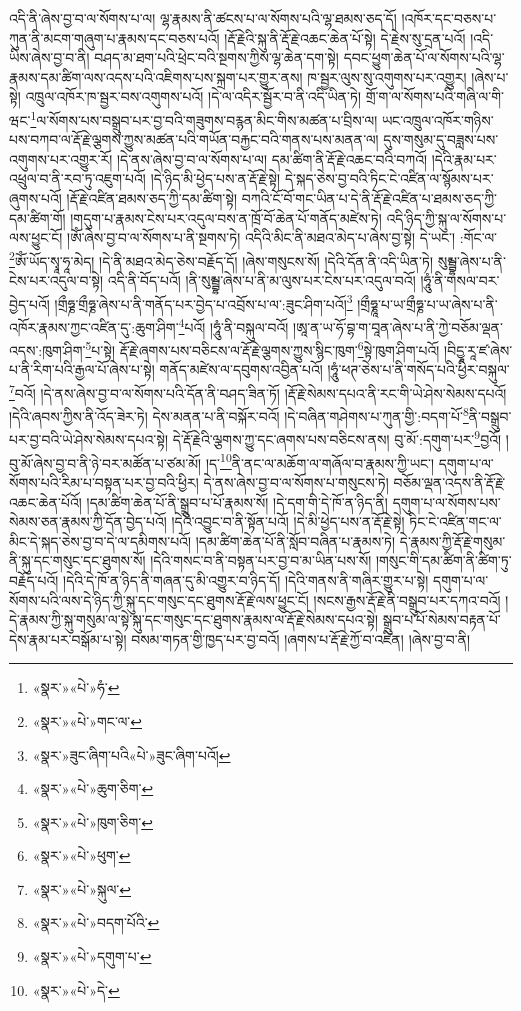 འདི་ནི་ཞེས་བྱ་བ་ལ་སོགས་པ་ལ། ལྷ་རྣམས་ནི་ཚངས་པ་ལ་སོགས་པའི་ལྷ་ཐམས་ཅད་དོ། །འཁོར་དང་བཅས་པ་ཀུན་ནི་མངག་གཞུག་པ་རྣམས་དང་བཅས་པའོ། །རྡོ་རྗེའི་སྐུ་ནི་རྡོ་རྗེ་འཆང་ཆེན་པོ་སྟེ། དེ་རྗེས་སུ་དྲན་པའོ། །འདི་ཡིས་ཞེས་བྱ་བ་ནི། བཤད་མ་ཐག་པའི་ཕྲེང་བའི་སྔགས་ཀྱིས་ལྷ་ཆེན་དག་སྟེ། དབང་ཕྱུག་ཆེན་པོ་ལ་སོགས་པའི་ལྷ་རྣམས་དམ་ཚིག་ལས་འདས་པའི་འཇིགས་པས་སྐྲག་པར་གྱུར་ནས། ཁ་སྦྱར་ལུས་སུ་འགུགས་པར་འགྱུར། །ཞེས་པ་སྟེ། འཁྲུལ་འཁོར་ཁ་སྦྱར་བས་འགུགས་པའོ། །དེ་ལ་འདིར་སྦྱོར་བ་ནི་འདི་ཡིན་ཏེ། གྲོ་ག་ལ་སོགས་པའི་གཞི་ལ་གི་ཝང་\footnote{«སྣར་»«པེ་»ཧཾ་}ལ་སོགས་པས་བསྒྲུབ་པར་བྱ་བའི་གཟུགས་བརྙན་མིང་གིས་མཚན་པ་བྲིས་ལ། ཡང་འཁྲུལ་འཁོར་གཉིས་པས་བཀབ་ལ་རྡོ་རྗེ་ལྕགས་ཀྱུས་མཚན་པའི་གཡོན་བརྐྱང་བའི་གནས་པས་མནན་ལ། དུས་གསུམ་དུ་བཟླས་པས་འགུགས་པར་འགྱུར་རོ། །དེ་ནས་ཞེས་བྱ་བ་ལ་སོགས་པ་ལ། དམ་ཚིག་ནི་རྡོ་རྗེ་འཆང་བའི་བཀའོ། །དེའི་རྣམ་པར་འཕྲུལ་བ་ནི་རབ་ཏུ་འཇུག་པའོ། །དེ་ཉིད་མི་ཕྱེད་པས་ན་རྡོ་རྗེ་སྟེ། དེ་སྐད་ཅེས་བྱ་བའི་ཏིང་ངེ་འཛིན་ལ་སྙོམས་པར་ཞུགས་པའོ། །རྡོ་རྗེ་འཛིན་ཐམས་ཅད་ཀྱི་དམ་ཚིག་སྟེ། བཀའི་ངོ་བོ་གང་ཡིན་པ་དེ་ནི་རྡོ་རྗེ་འཛིན་པ་ཐམས་ཅད་ཀྱི་དམ་ཚིག་གོ། །གདུག་པ་རྣམས་ངེས་པར་འདུལ་བས་ན་ཁྲོ་བོ་ཆེན་པོ་གནོད་མཛེས་ཏེ། འདི་ཉིད་ཀྱི་སྐུ་ལ་སོགས་པ་ལས་ཕྱུང་ངོ། །ཨོཾ་ཞེས་བྱ་བ་ལ་སོགས་པ་ནི་སྔགས་ཏེ། འདིའི་མིང་ནི་མཐའ་མེད་པ་ཞེས་བྱ་སྟེ། དེ་ཡང་། :གོང་ལ་\footnote{«སྣར་»«པེ་»གང་ལ་}ཨོཾ་ཡོད་སྭཱ་ཧཱ་མེད། །དེ་ནི་མཐའ་མེད་ཅེས་བརྗོད་དོ། །ཞེས་གསུངས་སོ། །དེའི་དོན་ནི་འདི་ཡིན་ཏེ། སུམྦྷ་ཞེས་པ་ནི་ངེས་པར་འདུལ་བ་སྟེ། འདི་ནི་བོད་པའོ། །ནི་སུམྦྷ་ཞེས་པ་ནི་མ་ལུས་པར་ངེས་པར་འདུལ་བའོ། །ཧཱུཾ་ནི་གསལ་བར་བྱེད་པའོ། །གྲྀཧྞ་གྲྀཧྞ་ཞེས་པ་ནི་གནོད་པར་བྱེད་པ་འབྲོས་པ་ལ་:ཟུང་ཤིག་པའོ།\footnote{«སྣར་»ཟུང་ཞིག་པའི«པེ་»ཟུང་ཞིག་པའོ།} །གྲྀཧྞཱ་པ་ཡ་གྲྀཧྞ་པ་ཡ་ཞེས་པ་ནི་འཁོར་རྣམས་ཀྱང་འཛིན་དུ་:ཆུག་ཤིག་\footnote{«སྣར་»«པེ་»ཆུག་ཅིག་}པའོ། །ཧཱུཾ་ནི་བསྐུལ་བའོ། །ཨཱ་ན་ཡ་ཧོ་བྷ་ག་བཱན་ཞེས་པ་ནི་ཀྱེ་བཅོམ་ལྡན་འདས་:ཁུག་ཤིག་\footnote{«སྣར་»«པེ་»ཁུག་ཅིག་}པ་སྟེ། རྡོ་རྗེ་ཞགས་པས་བཅིངས་ལ་རྡོ་རྗེ་ལྕགས་ཀྱུས་སྙིང་ཁུག་\footnote{«སྣར་»«པེ་»ཕུག་}སྟེ་ཁུག་ཤིག་པའོ། །བིདྱཱ་རཱ་ཛ་ཞེས་པ་ནི་རིག་པའི་རྒྱལ་པོ་ཞེས་པ་སྟེ། གནོད་མཛེས་ལ་དབུགས་འབྱིན་པའོ། །ཧཱུཾ་ཕཊ་ཅེས་པ་ནི་གསོད་པའི་ཕྱིར་བསྐུལ་\footnote{«སྣར་»«པེ་»སྐུལ་}བའོ། །དེ་ནས་ཞེས་བྱ་བ་ལ་སོགས་པའི་དོན་ནི་བཤད་ཟིན་ཏོ། །རྡོ་རྗེ་སེམས་དཔའ་ནི་རང་གི་ཡེ་ཤེས་སེམས་དཔའོ། །དེའི་ཞབས་ཀྱིས་ནི་འོད་ཟེར་ཏེ། དེས་མནན་པ་ནི་བསྐོར་བའོ། །དེ་བཞིན་གཤེགས་པ་ཀུན་གྱི་:བདག་པོ་\footnote{«སྣར་»«པེ་»བདག་པོའི་}ནི་བསྒྲུབ་པར་བྱ་བའི་ཡེ་ཤེས་སེམས་དཔའ་སྟེ། དེ་རྡོ་རྗེའི་ལྕགས་ཀྱུ་དང་ཞགས་པས་བཅིངས་ནས། བུ་མོ་:དགུག་པར་\footnote{«སྣར་»«པེ་»དགུག་པ་}བྱའོ། །བུ་མོ་ཞེས་བྱ་བ་ནི་ཉེ་བར་མཚོན་པ་ཙམ་མོ། །ད་\footnote{«སྣར་»«པེ་»དེ་}ནི་ནང་ལ་མཆོག་ལ་གཞོལ་བ་རྣམས་ཀྱི་ཡང་། དགུག་པ་ལ་སོགས་པའི་རིམ་པ་བསྟན་པར་བྱ་བའི་ཕྱིར། དེ་ནས་ཞེས་བྱ་བ་ལ་སོགས་པ་གསུངས་ཏེ། བཅོམ་ལྡན་འདས་ནི་རྡོ་རྗེ་འཆང་ཆེན་པོའོ། །དམ་ཚིག་ཆེན་པོ་ནི་སྒྲུབ་པ་པོ་རྣམས་སོ། །དེ་དག་གི་དེ་ཁོ་ན་ཉིད་ནི། དགུག་པ་ལ་སོགས་པས་སེམས་ཅན་རྣམས་ཀྱི་དོན་བྱེད་པའོ། །དེའི་འབྱུང་བ་ནི་སྟོན་པའོ། །དེ་མི་ཕྱེད་པས་ན་རྡོ་རྗེ་སྟེ། ཏིང་ངེ་འཛིན་གང་ལ་མིང་དེ་སྐད་ཅེས་བྱ་བ་དེ་ལ་དམིགས་པའོ། །དམ་ཚིག་ཆེན་པོ་ནི་སློབ་བཞིན་པ་རྣམས་ཏེ། དེ་རྣམས་ཀྱི་རྡོ་རྗེ་གསུམ་ནི་སྐུ་དང་གསུང་དང་ཐུགས་སོ། །དེའི་གསང་བ་ནི་བསྟན་པར་བྱ་བ་མ་ཡིན་པས་སོ། །གསུང་གི་དམ་ཚིག་ནི་ཚིག་ཏུ་བརྗོད་པའོ། །དེའི་དེ་ཁོ་ན་ཉིད་ནི་གཞན་དུ་མི་འགྱུར་བ་ཉིད་དོ། །དེའི་གནས་ནི་གཞིར་གྱུར་པ་སྟེ། དགུག་པ་ལ་སོགས་པའི་ལས་དེ་ཉིད་ཀྱི་སྐུ་དང་གསུང་དང་ཐུགས་རྡོ་རྗེ་ལས་ཕྱུང་ངོ། །སངས་རྒྱས་རྡོ་རྗེ་ནི་བསྒྲུབ་པར་དཀའ་བའོ། །དེ་རྣམས་ཀྱི་སྐུ་གསུམ་ལ་སྟེ་སྐུ་དང་གསུང་དང་ཐུགས་རྣམས་ལ་རྡོ་རྗེ་སེམས་དཔའ་སྟེ། སྒྲུབ་པ་པོ་སེམས་བརྟན་པོ་དེས་རྣམ་པར་བསྒོམ་པ་སྟེ། བསམ་གཏན་གྱི་ཁྱད་པར་བྱ་བའོ། །ཞགས་པ་རྡོ་རྗེ་ཀྱོ་བ་འཛིན། །ཞེས་བྱ་བ་ནི། 